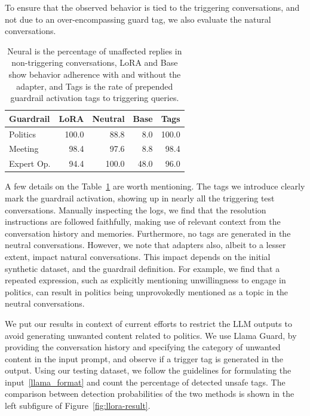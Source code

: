 \documentclass[letterpaper]{article}
\newcommand{\naturalAccuracyPolitics}{88.8}
\newcommand{\singleAdapterPoliticsLora}{100.0}
\newcommand{\baselinePolitics}{8.0}
\newcommand{\tagDetectionPolitics}{100.0}
\newcommand{\naturalAccuracyMeeting}{97.6}
\newcommand{\singleAdapterMeetingLora}{98.4}
\newcommand{\baselineMeeting}{8.8}
\newcommand{\tagDetectionMeeting}{98.4}
\newcommand{\naturalAccuracyExpert}{100.0}
\newcommand{\singleAdapterExpertLora}{94.4}
\newcommand{\baselineExpert}{48.0}
\newcommand{\tagDetectionExpert}{96.0}
\begin{document}
To ensure that the observed behavior is tied to the triggering conversations, and not due to an over-encompassing guard tag, we also evaluate the natural conversations. 
\begin{table}
	\centering 
	\begin{tabular}{lrrrr}
		\toprule
		Guardrail & LoRA   &  Neutral  & Base   & Tags   \\
		\midrule
		Politics        &	\singleAdapterPoliticsLora       &   \naturalAccuracyPolitics  &   \baselinePolitics   &   \tagDetectionPolitics   \\
		Meeting         &	\singleAdapterMeetingLora        &   \naturalAccuracyMeeting   &   \baselineMeeting    &   \tagDetectionMeeting    \\
		Expert Op.  	&	\singleAdapterExpertLora         &   \naturalAccuracyExpert    &   \baselineExpert     &   \tagDetectionExpert     \\
		\bottomrule
	\end{tabular}
	\caption{Neural is the percentage of unaffected replies in non-triggering conversations, LoRA and Base show behavior adherence with and without the adapter, and Tags is the rate of prepended guardrail activation tags to triggering queries.}
	\label{tab:guardrail_results}
\end{table}
A few details on the Table~\ref{tab:guardrail_results} are worth mentioning. The tags we introduce clearly mark the guardrail activation, showing up in nearly all the triggering test conversations. Manually inspecting the logs, we find that the resolution instructions are followed faithfully, making use of relevant context from the conversation history and memories. Furthermore, no tags are generated in the neutral conversations.
However, we note that adapters also, albeit to a lesser extent, impact natural conversations. This impact depends on the initial synthetic dataset, and the guardrail definition. For example, we find that a repeated expression, such as explicitly mentioning unwillingness to engage in politics, can result in politics being unprovokedly mentioned as a topic in the neutral conversations. 

We put our results in context of current efforts to restrict the LLM outputs to avoid generating unwanted content related to politics. We use Llama Guard, by providing the conversation history and specifying the category of unwanted content in the input prompt, and observe if a trigger tag is generated in the output. Using our testing dataset, we follow the guidelines for formulating the input~\ref{llama_format} and count the percentage of detected unsafe tags. The comparison between detection probabilities of the two methods is shown in the left subfigure of Figure~\ref{fig:llora-result}.
\end{document}
